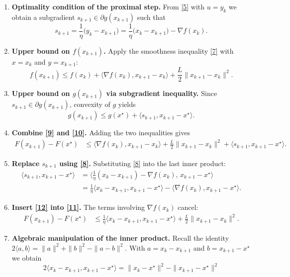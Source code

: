 \documentclass{article}
\newcommand{\grad}{\nabla}
\begin{document}
\begin{enumerate}
\item \textbf{Optimality condition of the proximal step.}  
From \eqref{5} with $u=y_{k}$ we obtain a subgradient $s_{k+1}\in\partial g(x_{k+1})$ such that
\[
s_{k+1}= \frac{1}{\eta}\bigl(y_{k}-x_{k+1}\bigr)
        =\frac{1}{\eta}\bigl(x_{k}-x_{k+1}\bigr)-\grad f(x_{k}).
\tag{8}
\]
\item \textbf{Upper bound on $f(x_{k+1})$.}  
Apply the smoothness inequality \eqref{7} with $x=x_{k}$ and $y=x_{k+1}$:
\[
f(x_{k+1})\le f(x_{k})+\langle\grad f(x_{k}),x_{k+1}-x_{k}\rangle
               +\frac{L}{2}\|x_{k+1}-x_{k}\|^{2}.
\tag{9}
\]
\item \textbf{Upper bound on $g(x_{k+1})$ via subgradient inequality.}  
Since $s_{k+1}\in\partial g(x_{k+1})$, convexity of $g$ yields
\[
g(x_{k+1})\le g(x^{\star})+\langle s_{k+1},x_{k+1}-x^{\star}\rangle.
\tag{10}
\]
\item \textbf{Combine \eqref{9} and \eqref{10}.}  
Adding the two inequalities gives
\[
\begin{aligned}
F(x_{k+1})-F(x^{\star})
&\le \langle\grad f(x_{k}),x_{k+1}-x_{k}\rangle
   +\frac{L}{2}\|x_{k+1}-x_{k}\|^{2}
   +\langle s_{k+1},x_{k+1}-x^{\star}\rangle .
\end{aligned}
\tag{11}
\]
\item \textbf{Replace $s_{k+1}$ using \eqref{8}.}  
Substituting \eqref{8} into the last inner product:
\[
\begin{aligned}
\langle s_{k+1},x_{k+1}-x^{\star}\rangle
&= \Big\langle\frac{1}{\eta}(x_{k}-x_{k+1})-\grad f(x_{k}),\,x_{k+1}-x^{\star}\Big\rangle\\
&= \frac{1}{\eta}\langle x_{k}-x_{k+1},x_{k+1}-x^{\star}\rangle
   -\langle\grad f(x_{k}),x_{k+1}-x^{\star}\rangle .
\end{aligned}
\tag{12}
\]
\item \textbf{Insert \eqref{12} into \eqref{11}.}  
The terms involving $\grad f(x_{k})$ cancel:
\[
\begin{aligned}
F(x_{k+1})-F(x^{\star})
&\le \frac{1}{\eta}\langle x_{k}-x_{k+1},x_{k+1}-x^{\star}\rangle
   +\frac{L}{2}\|x_{k+1}-x_{k}\|^{2}.
\end{aligned}
\tag{13}
\]
\item \textbf{Algebraic manipulation of the inner product.}  
Recall the identity $2\langle a,b\rangle =\|a\|^{2}+\|b\|^{2}-\|a-b\|^{2}$.  
With $a=x_{k}-x_{k+1}$ and $b=x_{k+1}-x^{\star}$ we obtain
\[
2\langle x_{k}-x_{k+1},x_{k+1}-x^{\star}\rangle
   =\|x_{k}-x^{\star}\|^{2}-\|x_{k+1}-x^{\star}\|^{2}
\]
\end{enumerate}
\end{document}
